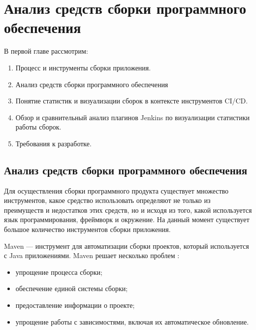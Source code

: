 \chapter{Анализ средств сборки программного обеспечения} \label{ch1}


В первой главе рассмотрим:

\begin{enumerate}
	\item Процесс и инструменты сборки приложения.
	
	\item Анализ средств сборки программного обеспечения%
	
	\item Понятие статистик и визуализации сборок в контексте инструментов CI/CD.
	
	\item Обзор и сравнительный анализ плагинов Jenkins по визуализации статистики работы сборок.
	
	\item Требования к разработке.
	
	
\end{enumerate}

\section{Анализ средств сборки программного обеспечения} \label{ch1:sec1}

Для осуществления сборки программного продукта существует множество инструментов, какое средство использовать определяют не только из преимуществ и недостатков этих средств, но и исходя из того, какой используется язык программирования, фреймворк и окружение.
На данный момент существует большое количество инструментов сборки приложения. 

Maven — инструмент для автоматизации сборки проектов, который используется с Java приложениями. Maven решает несколько проблем \cite{maven}:

\begin{itemize}
	\item  упрощение процесса сборки;
	\item обеспечение единой системы сборки;
	\item предоставление информации о проекте;
	\item упрощение работы с зависимостями, включая их автоматическое обновление.
\end{itemize}

